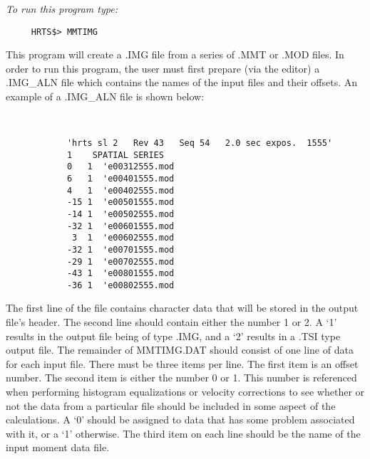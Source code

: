 {\em To run this program type:}
\begin{verbatim}
     HRTS$> MMTIMG               
\end{verbatim}
      This program will create a .IMG file from a series of .MMT or .MOD
   files.  In order to run this program, the user must first prepare (via
   the editor) a .IMG\_ALN file which contains the names of the input files
   and their offsets.  An example of a .IMG\_ALN file is shown below:
\begin{verbatim}      
   

            'hrts sl 2   Rev 43   Seq 54   2.0 sec expos.  1555' 
            1    SPATIAL SERIES                                  
            0   1  'e00312555.mod                                
            6   1  'e00401555.mod                                
            4   1  'e00402555.mod                                
            -15 1  'e00501555.mod                                
            -14 1  'e00502555.mod                                
            -32 1  'e00601555.mod                                
             3  1  'e00602555.mod                                
            -32 1  'e00701555.mod                                
            -29 1  'e00702555.mod                                
            -43 1  'e00801555.mod                                
            -36 1  'e00802555.mod                                

\end{verbatim}   
      The first line of the file contains character data that will be
   stored in the output file's header.  The second line should contain
   either the number 1 or 2.  A `1' results in the output file being of
   type .IMG, and a `2' results in a .TSI type output file.  The remainder
   of MMTIMG.DAT should consist of one line of data for each input file.
   There must be three items per line.  The first item is an offset
   number.  
   The second item is either the number 0 or 1.  This number is
   referenced when performing histogram equalizations or velocity
   corrections to see whether or not the data from a particular file
   should be included in some aspect of the calculations.  A `0' should be
   assigned to data that has some problem associated with it, or a `1'
   otherwise.  The third item on each line should be the name of the input
   moment data file.

